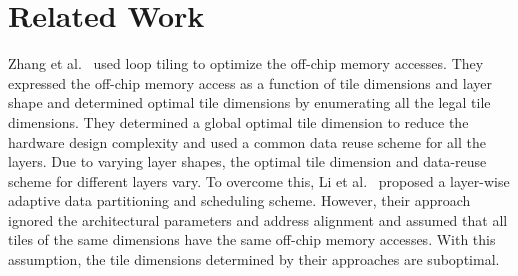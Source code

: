 \section{Related Work}
Zhang et al.~\cite{zhang2015optimizing} used loop tiling to optimize the off-chip memory accesses. They expressed the off-chip memory access as a function of tile dimensions and layer shape and determined optimal tile dimensions by enumerating all the legal tile dimensions. They determined a global optimal tile dimension to reduce the hardware design complexity and used a common data reuse scheme for all the layers. Due to varying layer shapes, the optimal tile dimension and data-reuse scheme for different layers vary. To overcome this, Li et al.~\cite{Li2018SmartShuttleOO} proposed a layer-wise adaptive data partitioning and scheduling scheme. However, their approach ignored the architectural parameters and address alignment and assumed that all tiles of the same dimensions have the same off-chip memory accesses. With this assumption, the tile dimensions determined by their approaches are suboptimal.
